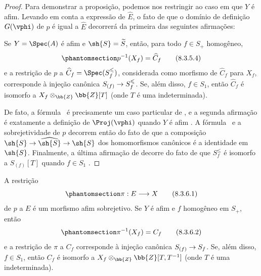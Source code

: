 \documentclass[oneside,10pt]{amsart}
\makeatletter
\renewcommand{\leq}{\leqslant}
\newcommand{\ega@arrow}[2]{\mathchoice{#1}{#2}{#2}{#2}}
\renewcommand{\to}{\ega@arrow{\longrightarrow}{\rightarrow}}
\let\EGAOriginalLabel\label
\renewcommand{\label}[1]{\phantomsection\EGAOriginalLabel{#1}}
\makeatother
\begin{document}
\begin{proof}
Para demonstrar a proposição, podemos nos restringir ao caso em que $Y$ é afim.
Levando em conta a expressão  de $\widehat{E}$, o fato de que o domínio de definição $G(\vphi)$ de $p$ é igual a $\widehat{E}$ decorrerá da primeira das seguintes afirmações:
\begin{env}[8.3.5.3]
\label{II.8.3.5.3}
Se $Y=\Spec(A)$ é afim e $\sh{S}=\widetilde{S}$, então, para todo $f\in S_+$ homogêneo,
\[
\label{II.8.3.5.4}
  p^{-1}(X_f) = \widehat{C}_f
\tag{8.3.5.4}
\]
e a restrição de $p$ a $\widehat{C}_f=\Spec(S_f^\leq)$, considerada como morfismo de $\widehat{C}_f$ para $X_f$, corresponde à injeção canônica $S_{(f)}\to S_f^\leq$.
Se, além disso, $f\in S_1$, então $\widehat{C}_f$ é isomorfo a $X_f\otimes_{\bb{Z}}\bb{Z}[T]$ (onde $T$ é uma indeterminada).
\end{env}

De fato, a fórmula~ é precisamente um caso particular de , e a segunda afirmação é exatamente a definição de $\Proj(\vphi)$ quando $Y$ é afim .
A fórmula~ e a sobrejetividade de $p$ decorrem então do fato de que a composição $\sh{S}\to\widehat{\sh{S}}\to\sh{S}$ dos homomorfismos canônicos é a identidade em $\sh{S}$.
Finalmente, a última afirmação de  decorre do fato de que $S_f^\leq$ é isomorfo a $S_{(f)}[T]$ quando $f\in S_1$ .
\end{proof}
\begin{corollary}[8.3.6]
\label{II.8.3.6}
A restrição
\[
\label{II.8.3.6.1}
  \pi: E \to X
\tag{8.3.6.1}
\]
de $p$ a $E$ é um morfismo afim sobrejetivo.
Se $Y$ é afim e $f$ homogêneo em $S_+$, então
\[
\label{II.8.3.6.2}
  \pi^{-1}(X_f) = C_f
\tag{8.3.6.2}
\]
e a restrição de $\pi$ a $C_f$ corresponde à injeção canônica $S_{(f)}\to S_f$.
Se, além disso, $f\in S_1$, então $C_f$ é isomorfo a $X_f\otimes_{\bb{Z}}\bb{Z}[T,T^{-1}]$ (onde $T$ é uma indeterminada).
\end{corollary}
\end{document}
